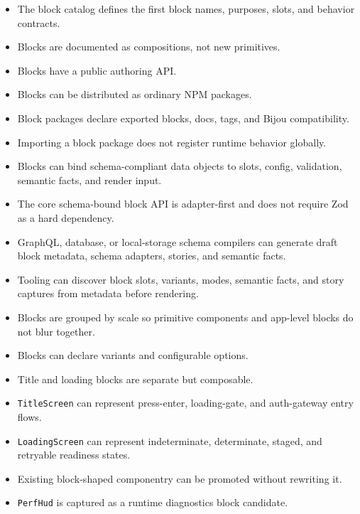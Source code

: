 \begin{itemize}
\tightlist
\item
  The block catalog defines the first block names, purposes, slots, and behavior contracts.
\item
  Blocks are documented as compositions, not new primitives.
\item
  Blocks have a public authoring API.
\item
  Blocks can be distributed as ordinary NPM packages.
\item
  Block packages declare exported blocks, docs, tags, and Bijou compatibility.
\item
  Importing a block package does not register runtime behavior globally.
\item
  Blocks can bind schema-compliant data objects to slots, config, validation, semantic facts, and render input.
\item
  The core schema-bound block API is adapter-first and does not require Zod as a hard dependency.
\item
  GraphQL, database, or local-storage schema compilers can generate draft block metadata, schema adapters, stories, and semantic facts.
\item
  Tooling can discover block slots, variants, modes, semantic facts, and story captures from metadata before rendering.
\item
  Blocks are grouped by scale so primitive components and app-level blocks do not blur together.
\item
  Blocks can declare variants and configurable options.
\item
  Title and loading blocks are separate but composable.
\item
  \texttt{T\allowbreak{}i\allowbreak{}t\allowbreak{}l\allowbreak{}e\allowbreak{}S\allowbreak{}c\allowbreak{}r\allowbreak{}e\allowbreak{}e\allowbreak{}n} can represent press-enter, loading-gate, and auth-gateway entry flows.
\item
  \texttt{L\allowbreak{}o\allowbreak{}a\allowbreak{}d\allowbreak{}i\allowbreak{}n\allowbreak{}g\allowbreak{}S\allowbreak{}c\allowbreak{}r\allowbreak{}e\allowbreak{}e\allowbreak{}n} can represent indeterminate, determinate, staged, and retryable readiness states.
\item
  Existing block-shaped componentry can be promoted without rewriting it.
\item
  \texttt{P\allowbreak{}e\allowbreak{}r\allowbreak{}f\allowbreak{}H\allowbreak{}u\allowbreak{}d} is captured as a runtime diagnostics block candidate.

\end{itemize}
